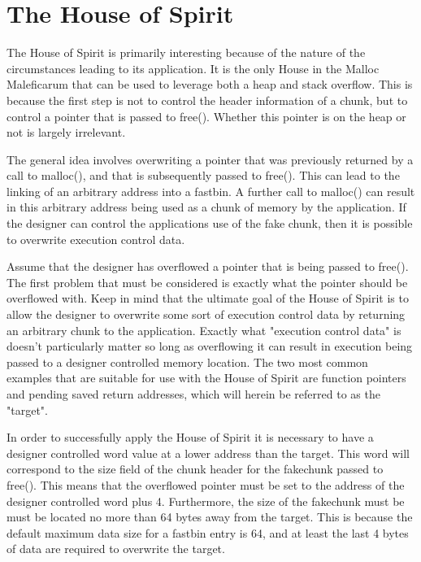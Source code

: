\documentclass[12pt]{article}
\begin{document}
\section{The House of Spirit}


The House of Spirit is primarily interesting because of the nature
of the circumstances leading to its application. It is the only
House in the Malloc Maleficarum that can be used to leverage both a
heap and stack overflow. This is because the first step is not to
control the header information of a chunk, but to control a pointer
that is passed to free(). Whether this pointer is on the heap or
not is largely irrelevant.
\newline


The general idea involves overwriting a pointer that was previously
returned by a call to malloc(), and that is subsequently passed to
free(). This can lead to the linking of an arbitrary address into a
fastbin. A further call to malloc() can result in this arbitrary
address being used as a chunk of memory by the application. If the
designer can control the applications use of the fake chunk, then
it is possible to overwrite execution control data.
\newline


Assume that the designer has overflowed a pointer that is being
passed to free(). The first problem that must be considered is
exactly what the pointer should be overflowed with. Keep in mind
that the ultimate goal of the House of Spirit is to allow the
designer to overwrite some sort of execution control data by
returning an arbitrary chunk to the application. Exactly what
"execution control data" is doesn't particularly matter so long as
overflowing it can result in execution being passed to a designer
controlled memory location. The two most common examples that are
suitable for use with the House of Spirit are function pointers and
pending saved return addresses, which will herein be referred to as
the "target".
\newline


In order to successfully apply the House of Spirit it is necessary
to have a designer controlled word value at a lower address than
the target. This word will correspond to the size field of the
chunk header for the fakechunk passed to free(). This means that
the overflowed pointer must be set to the address of the designer
controlled word plus 4. Furthermore, the size of the fakechunk must
be must be located no more than 64 bytes away from the target. This
is because the default maximum data size for a fastbin entry is 64,
and at least the last 4 bytes of data are required to overwrite the
target.
\newline
\end{document}
